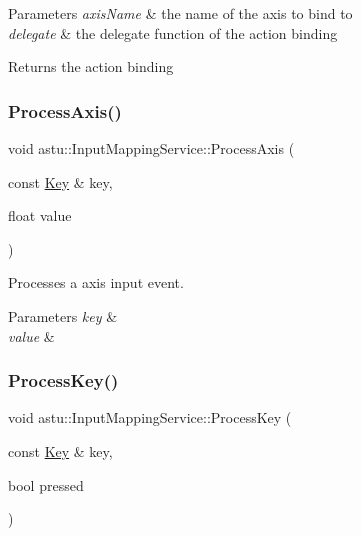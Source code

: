 \begin{DoxyParams}{Parameters}
{\em axis\+Name} & the name of the axis to bind to \\
\hline
{\em delegate} & the delegate function of the action binding \\
\hline
\end{DoxyParams}
\begin{DoxyReturn}{Returns}
the action binding 
\end{DoxyReturn}
\mbox{\label{classastu_1_1InputMappingService_a1779fb5dee6693257710f887b1287be8}} 
\subsubsection{\texorpdfstring{Process\+Axis()}{ProcessAxis()}}
{\footnotesize\ttfamily void astu\+::\+Input\+Mapping\+Service\+::\+Process\+Axis (\begin{DoxyParamCaption}\item[{const \hyperlink{classastu_1_1Key}{Key} \&}]{key,  }\item[{float}]{value }\end{DoxyParamCaption})}

Processes a axis input event.


\begin{DoxyParams}{Parameters}
{\em key} & \\
\hline
{\em value} & \\
\hline
\end{DoxyParams}
\mbox{\label{classastu_1_1InputMappingService_a88ec7a02d2e76d62033491d8c70610fc}} 
\subsubsection{\texorpdfstring{Process\+Key()}{ProcessKey()}}
{\footnotesize\ttfamily void astu\+::\+Input\+Mapping\+Service\+::\+Process\+Key (\begin{DoxyParamCaption}\item[{const \hyperlink{classastu_1_1Key}{Key} \&}]{key,  }\item[{bool}]{pressed }\end{DoxyParamCaption})}

